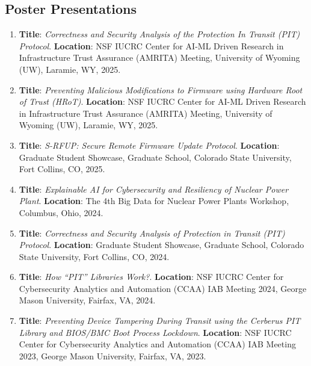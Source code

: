 \documentclass[11pt, a4paper]{article}
\begin{document}
\subsection{\color{cvred}Poster Presentations}

\begin{enumerate}[leftmargin=*, label=\arabic*., itemsep=4pt, topsep=2pt]

\item \textbf{Title}: \textit{\color{cvred}Correctness and Security Analysis of the Protection In Transit (PIT) Protocol}. \textbf{Location}: NSF IUCRC Center for AI-ML Driven Research in Infrastructure Trust Assurance (AMRITA) Meeting, University of Wyoming (UW), Laramie, WY, 2025.

\item \textbf{Title}: \textit{\color{cvred}Preventing Malicious Modifications to Firmware using Hardware Root of Trust (HRoT)}. \textbf{Location}: NSF IUCRC Center for AI-ML Driven Research in Infrastructure Trust Assurance (AMRITA) Meeting, University of Wyoming (UW), Laramie, WY, 2025.

\item \textbf{Title}: \textit{\color{cvred} S-RFUP: Secure Remote Firmware Update
Protocol}. \textbf{Location}: Graduate Student Showcase, Graduate School, Colorado State University, Fort Collins, CO, 2025.

\item \textbf{Title}: \textit{\color{cvred} Explainable AI for Cybersecurity and Resiliency of Nuclear Power Plant}. \textbf{Location}: The 4th Big Data for Nuclear Power Plants Workshop, Columbus, Ohio, 2024.

\item \textbf{Title}: \textit{\color{cvred} Correctness and Security Analysis of Protection in Transit (PIT) Protocol}. \textbf{Location}: Graduate Student Showcase, Graduate School, Colorado State University, Fort Collins, CO, 2024.

\item \textbf{Title}: \textit{\color{cvred} How ``PIT'' Libraries Work?}. \textbf{Location}: NSF IUCRC Center for Cybersecurity Analytics and Automation (CCAA) IAB Meeting 2024, George Mason University, Fairfax, VA, 2024.

\item \textbf{Title}: \textit{\color{cvred} Preventing Device Tampering During Transit using the Cerberus PIT Library and BIOS/BMC Boot Process Lockdown}. \textbf{Location}: NSF IUCRC Center for Cybersecurity Analytics and Automation (CCAA) IAB Meeting 2023, George Mason University, Fairfax, VA, 2023.


\end{enumerate}
\end{document}
